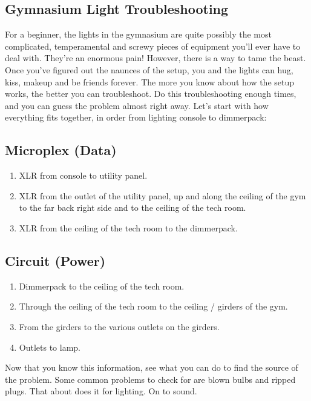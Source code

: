 \documentclass[letterpaper,10pt,oneside,headsepline]{scrreprt}
\begin{document}
\subsection{Gymnasium Light Troubleshooting}
For a beginner, the lights in the gymnasium are quite possibly the most complicated, temperamental and screwy pieces of equipment you'll ever have to deal with. They're an enormous pain! However, there is a way to tame the beast. Once you've figured out the naunces of the setup, you and the lights can hug, kiss, makeup and be friends forever. The more you know about how the setup works, the better you can troubleshoot. Do this troubleshooting enough times, and you can guess the problem almost right away. Let's start with how everything fits together, in order from lighting console to dimmerpack:
\subsection{Microplex (Data)}
\begin{enumerate}
\item XLR from console to utility panel.
\item XLR from the outlet of the utility panel, up and along the ceiling of the gym to the far back right side and to the ceiling of the tech room.
\item XLR from the ceiling of the tech room to the dimmerpack.
\end{enumerate}

\subsection{Circuit (Power)}
\begin{enumerate}
\item Dimmerpack to the ceiling of the tech room.
\item Through the ceiling of the tech room to the ceiling / girders of the gym.
\item From the girders to the various outlets on the girders.
\item Outlets to lamp.
\end{enumerate}

Now that you know this information, see what you can do to find the source of the problem. Some common problems to check for are blown bulbs and ripped plugs. That about does it for lighting. On to sound.
\end{document}
